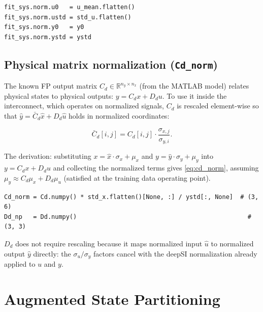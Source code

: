 \documentclass[11pt,a4paper]{article}
\newcommand{\codetitle}[2]{\small\texttt{#1}\quad lines #2}
\begin{document}
\begin{lstlisting}[style=py,
  title={\codetitle{gantry\_interconnect\_dynamic.py}{287--290}},
  firstnumber=287]
fit_sys.norm.u0   = u_mean.flatten()
fit_sys.norm.ustd = std_u.flatten()
fit_sys.norm.y0   = y0
fit_sys.norm.ystd = ystd
\end{lstlisting}

\subsection{Physical matrix normalization (\texttt{Cd\_norm})}

The known FP output matrix $C_d \in \mathbb{R}^{n_y \times n_x}$ (from the
MATLAB model) relates physical states to physical outputs:
$y = C_d x + D_d u$.
To use it inside the interconnect, which operates on normalized signals,
$C_d$ is rescaled element-wise so that
$\hat{y} = \bar{C}_d \hat{x} + D_d \hat{u}$
holds in normalized coordinates:

\begin{equation}
  \bar{C}_d[i,j] = C_d[i,j] \cdot \frac{\sigma_{x,j}}{\sigma_{y,i}}.
  \label{eq:cd_norm}
\end{equation}

The derivation: substituting $x = \hat{x} \cdot \sigma_x + \mu_x$ and
$y = \hat{y} \cdot \sigma_y + \mu_y$ into $y = C_d x + D_d u$ and
collecting the normalized terms gives \eqref{eq:cd_norm},
assuming $\mu_y \approx C_d \mu_x + D_d \mu_u$ (satisfied at the training
data operating point).

\begin{lstlisting}[style=py,
  title={\codetitle{gantry\_interconnect\_dynamic.py}{187--188}},
  firstnumber=187]
Cd_norm = Cd.numpy() * std_x.flatten()[None, :] / ystd[:, None]  # (3, 6)
Dd_np   = Dd.numpy()                                               # (3, 3)
\end{lstlisting}

$D_d$ does not require rescaling because it maps normalized input
$\hat{u}$ to normalized output $\hat{y}$ directly: the $\sigma_u / \sigma_y$
factors cancel with the deepSI normalization already applied to $u$ and $y$.

\section{Augmented State Partitioning}
\label{sec:states}
\end{document}
